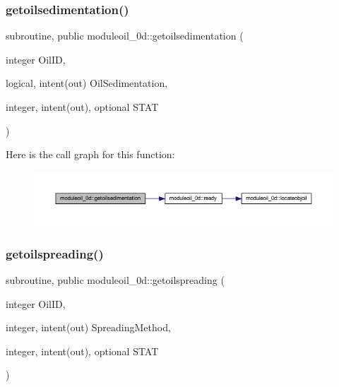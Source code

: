 \subsubsection{\texorpdfstring{getoilsedimentation()}{getoilsedimentation()}}
{\footnotesize\ttfamily subroutine, public moduleoil\+\_\+0d\+::getoilsedimentation (\begin{DoxyParamCaption}\item[{integer}]{Oil\+ID,  }\item[{logical, intent(out)}]{Oil\+Sedimentation,  }\item[{integer, intent(out), optional}]{S\+T\+AT }\end{DoxyParamCaption})}

Here is the call graph for this function\+:\nopagebreak
\begin{figure}[H]
\begin{center}
\leavevmode
\includegraphics[width=350pt]{namespacemoduleoil__0d_a76e417f6fa89172bc195c9dca9d10dc7_cgraph}
\end{center}
\end{figure}
\mbox{\label{namespacemoduleoil__0d_af99e71581dc3e88eb79bbabd1712077d}} 
\subsubsection{\texorpdfstring{getoilspreading()}{getoilspreading()}}
{\footnotesize\ttfamily subroutine, public moduleoil\+\_\+0d\+::getoilspreading (\begin{DoxyParamCaption}\item[{integer}]{Oil\+ID,  }\item[{integer, intent(out)}]{Spreading\+Method,  }\item[{integer, intent(out), optional}]{S\+T\+AT }\end{DoxyParamCaption})}

